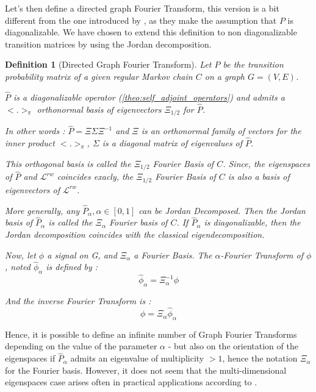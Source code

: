 \documentclass[sn-mathphys]{sn-jnl}%
\theoremstyle{thmstyleone}%
\theoremstyle{thmstyletwo}%
\theoremstyle{thmstylethree}%
\newtheorem{definition}[theo]{Definition}
\begin{document}
Let's then define a directed graph Fourier Transform, this version is
a bit different from the one introduced by \cite{sevi2019}, as they
make the assumption that $P$ is diagonalizable. We have chosen to
extend this definition to non diagonalizable transition matrices by
using the Jordan decomposition.

\begin{definition}[Directed Graph Fourier Transform]\label{def:directed_graph_fourier_transform}
  Let $P$ be the transition probability matrix of a given regular
  Markov chain $C$ on a graph $G=(V,E)$.

  $\hat{P}$ is a diagonalizable operator
  (\ref{theo:self_adjoint_operators}) and admits a $<.>_{\pi}$
  orthonormal basis of eigenvectors $\Xi_{1/2}$ for $\hat{P}$.

  In other words : $\hat{P} = \Xi \Sigma \Xi^{-1}$ and $\Xi$ is an
  orthonormal family of vectors for the inner product $<.>_{\pi}$,
  $\Sigma$ is a diagonal matrix of eigenvalues of $\hat{P}$.

  This orthogonal basis is called the $\Xi_{1/2}$ Fourier Basis of
  $C$. Since, the eigenspaces of $\hat{P}$ and $\mathcal{L}^{rw}$
  coincides exacly, the $\Xi_{1/2}$ Fourier Basis of $C$ is also a
  basis of eigenvectors of $\mathcal{L}^{rw}$.

  More generally, any $\hat{P}_\alpha, \alpha \in [0,1]$ can be Jordan
  Decomposed. Then the Jordan basis of $\hat{P}_\alpha$ is called the
  $\Xi_\alpha$ Fourier basis of $C$. If $\hat{P}_\alpha$ is
  diagonalizable, then the Jordan decomposition coincides with the
  classical eigendecomposition.

  Now, let $\phi$ a signal on G, and $\Xi_\alpha$ a Fourier Basis. The
  $\alpha$-Fourier Transform of $\phi$, noted $\hat{\phi}_\alpha$ is
  defined by :
  \begin{equation}
    \hat{\phi}_\alpha = \Xi_\alpha^{-1} \phi
  \end{equation}
  
  And the inverse Fourier Transform is :
  \begin{equation}
    \phi = \Xi_\alpha \hat{\phi}_\alpha
  \end{equation}
  
\end{definition}

Hence, it is possible to define an infinite number of Graph Fourier
Transforms depending on the value of the parameter $\alpha$ - but also
on the orientation of the eigenspaces if $\hat{P}_\alpha$ admits an
eigenvalue of multiplicity $>1$, hence the notation $\Xi_\alpha$ for
the Fourier basis. However, it does not seem that the
multi-dimensional eigenspaces case arises often in practical
applications according to \cite{sevi2019}.
\end{document}
